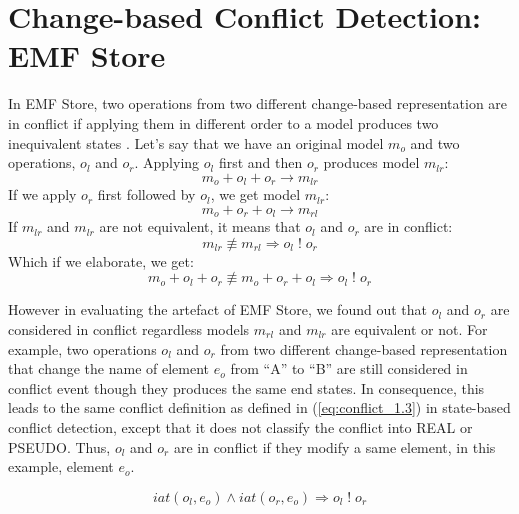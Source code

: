 \section{Change-based Conflict Detection: EMF Store}
\label{sec:change_based_conflict_detection_emf_store}
In EMF Store, two operations from two different change-based representation are in conflict if applying them in different order to a model produces two inequivalent states \cite{koegel2010emfstore}. Let's say that we have an original model $m_{o}$ and two operations, $o_{l}$ and $o_{r}$. Applying $o_{l}$ first and then $o_{r}$ produces model $m_{lr}$:
\begin{equation} \label{eq:conflict_2.1}
m_{o} + o_{l} + o_{r} \rightarrow m_{lr}
\end{equation}
If we apply $o_{r}$ first followed by $o_{l}$, we get model $m_{lr}$:
\begin{equation} \label{eq:conflict_2.2}
m_{o} + o_{r} + o_{l} \rightarrow m_{rl}
\end{equation}
If $m_{lr}$ and $m_{lr}$ are not equivalent, it means that $o_{l}$ and $o_{r}$ are in conflict:
\begin{equation} \label{eq:conflict_2.3}
m_{lr} \not\equiv m_{rl} \Rightarrow o_{l}\;!\;o_{r} 
\end{equation}
Which if we elaborate, we get:
\begin{equation} \label{eq:conflict_2.4}
m_{o} + o_{l} + o_{r} \not\equiv m_{o} + o_{r} + o_{l} \Rightarrow o_{l}\;!\;o_{r}
\end{equation} 

However in evaluating the artefact of EMF Store, we found out that $o_{l}$ and $o_{r}$ are considered in conflict regardless models $m_{rl}$ and $m_{lr}$ are equivalent or not. For example, two operations $o_{l}$ and $o_{r}$ from two different change-based representation that change the \textsf{name} of element $e_{o}$ from ``A'' to ``B'' are still considered in conflict event though they produces the same end states. In consequence, this leads to the same conflict definition as defined in (\ref{eq:conflict_1.3}) in state-based conflict detection, except that it does not classify the conflict into \textsf{REAL} or \textsf{PSEUDO}. Thus, $o_{l}$ and $o_{r}$ are in conflict if they modify a same element, in this example, element $e_{o}$. 

\begin{equation} \label{eq:conflict_2.5}
iat(o_{l}, e_{o}) \wedge iat(o_{r}, e_{o}) \Rightarrow o_{l}\;!\;o_{r}
\end{equation} 

